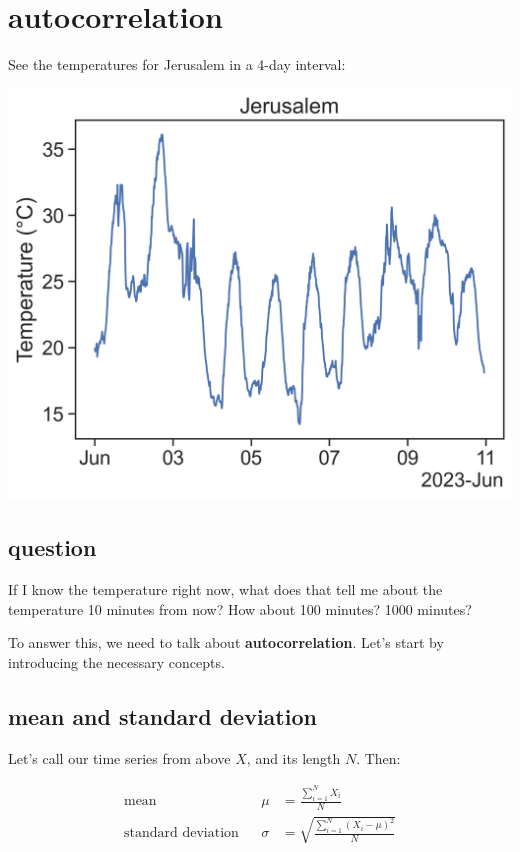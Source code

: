\documentclass[
  letterpaper,
  DIV=11,
  numbers=noendperiod,
  oneside]{scrreprt}
\begin{document}
\hypertarget{autocorrelation}{%
\chapter{autocorrelation}\label{autocorrelation}}

See the temperatures for Jerusalem in a 4-day interval:

\includegraphics{stationarity/jer_temp1.png}

\hypertarget{question}{%
\section{question}\label{question}}

If I know the temperature right now, what does that tell me about the
temperature 10 minutes from now? How about 100 minutes? 1000 minutes?

To answer this, we need to talk about \textbf{autocorrelation}. Let's
start by introducing the necessary concepts.

\hypertarget{mean-and-standard-deviation}{%
\section{mean and standard
deviation}\label{mean-and-standard-deviation}}

Let's call our time series from above \(X\), and its length \(N\). Then:

\[
\begin{aligned}
\text{mean}& &\mu &= \frac{\displaystyle\sum_{i=1}^N X_i}{N} \\
\text{standard deviation}& &\sigma &= \sqrt{\frac{\displaystyle\sum_{i=1}^N (X_i-\mu)^2}{N}}
\end{aligned}
\]
\end{document}
